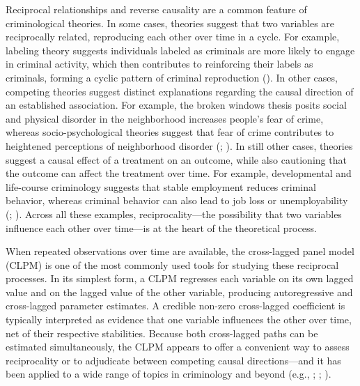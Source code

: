 \documentclass[
  letterpaper,
  DIV=11,
  numbers=noendperiod]{scrartcl}
\begin{document}
Reciprocal relationships and reverse causality are a common feature of
criminological theories. In some cases, theories suggest that two
variables are reciprocally related, reproducing each other over time in
a cycle. For example, labeling theory suggests individuals labeled as
criminals are more likely to engage in criminal activity, which then
contributes to reinforcing their labels as criminals, forming a cyclic
pattern of criminal reproduction
(). In other cases,
competing theories suggest distinct explanations regarding the causal
direction of an established association. For example, the broken windows
thesis posits social and physical disorder in the neighborhood increases
people's fear of crime, whereas socio-psychological theories suggest
that fear of crime contributes to heightened perceptions of neighborhood
disorder (;
). In still other
cases, theories suggest a causal effect of a treatment on an outcome,
while also cautioning that the outcome can affect the treatment over
time. For example, developmental and life-course criminology suggests
that stable employment reduces criminal behavior, whereas criminal
behavior can also lead to job loss or unemployability
(;
). Across all these
examples, reciprocality---the possibility that two variables influence
each other over time---is at the heart of the theoretical process.

When repeated observations over time are available, the cross-lagged
panel model (CLPM) is one of the most commonly used tools for studying
these reciprocal processes. In its simplest form, a CLPM regresses each
variable on its own lagged value and on the lagged value of the other
variable, producing autoregressive and cross-lagged parameter estimates.
A credible non-zero cross-lagged coefficient is typically interpreted as
evidence that one variable influences the other over time, net of their
respective stabilities. Because both cross-lagged paths can be estimated
simultaneously, the CLPM appears to offer a convenient way to assess
reciprocality or to adjudicate between competing causal directions---and
it has been applied to a wide range of topics in criminology and beyond
(e.g., ;
;
).
\end{document}
